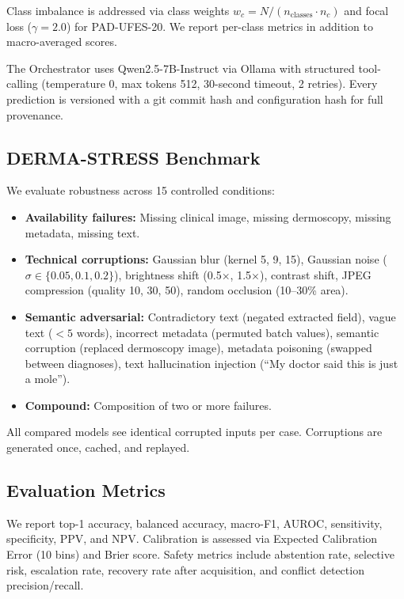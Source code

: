 \documentclass[conference]{IEEEtran}
\begin{document}
Class imbalance is addressed via class weights $w_c = N / (n_{\text{classes}} \cdot n_c)$ and focal loss ($\gamma = 2.0$) for PAD-UFES-20. We report per-class metrics in addition to macro-averaged scores.

The Orchestrator uses Qwen2.5-7B-Instruct via Ollama with structured tool-calling (temperature 0, max tokens 512, 30-second timeout, 2 retries). Every prediction is versioned with a git commit hash and configuration hash for full provenance.

\subsection{DERMA-STRESS Benchmark}

We evaluate robustness across 15 controlled conditions:

\begin{itemize}
    \item \textbf{Availability failures:} Missing clinical image, missing dermoscopy, missing metadata, missing text.
    \item \textbf{Technical corruptions:} Gaussian blur (kernel 5, 9, 15), Gaussian noise ($\sigma \in \{0.05, 0.1, 0.2\}$), brightness shift (0.5$\times$, 1.5$\times$), contrast shift, JPEG compression (quality 10, 30, 50), random occlusion (10--30\% area).
    \item \textbf{Semantic adversarial:} Contradictory text (negated extracted field), vague text ($<5$ words), incorrect metadata (permuted batch values), semantic corruption (replaced dermoscopy image), metadata poisoning (swapped between diagnoses), text hallucination injection (``My doctor said this is just a mole'').
    \item \textbf{Compound:} Composition of two or more failures.
\end{itemize}

All compared models see identical corrupted inputs per case. Corruptions are generated once, cached, and replayed.

\subsection{Evaluation Metrics}

We report top-1 accuracy, balanced accuracy, macro-F1, AUROC, sensitivity, specificity, PPV, and NPV. Calibration is assessed via Expected Calibration Error (10 bins) and Brier score. Safety metrics include abstention rate, selective risk, escalation rate, recovery rate after acquisition, and conflict detection precision/recall.
\end{document}
